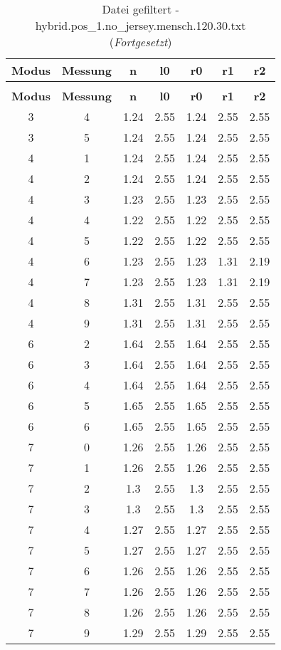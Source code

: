 \begin{longtable}{|c|c||c||c||c|c|c|}
	\caption{Datei gefiltert - hybrid.pos\_1.no\_jersey.mensch.120.30.txt} \label{tab:hybrid.pos-1.no-jersey.mensch.120.30.txt} \\ \hline
	\textbf{Modus} & \textbf{Messung} & \textbf{n} & \textbf{l0} & \textbf{r0} & \textbf{r1} & \textbf{r2}\\ \hline
	\endfirsthead
	\caption[]{Datei gefiltert - hybrid.pos\_1.no\_jersey.mensch.120.30.txt (\emph{Fortgesetzt})} \\ \hline
	\textbf{Modus} & \textbf{Messung} & \textbf{n} & \textbf{l0} & \textbf{r0} & \textbf{r1} & \textbf{r2}\\ \hline
	\endhead
	3 & 4 & 1.24 & 2.55 & 1.24 & 2.55 & 2.55 \\ \hline
	3 & 5 & 1.24 & 2.55 & 1.24 & 2.55 & 2.55 \\ \hline
	4 & 1 & 1.24 & 2.55 & 1.24 & 2.55 & 2.55 \\ \hline
	4 & 2 & 1.24 & 2.55 & 1.24 & 2.55 & 2.55 \\ \hline
	4 & 3 & 1.23 & 2.55 & 1.23 & 2.55 & 2.55 \\ \hline
	4 & 4 & 1.22 & 2.55 & 1.22 & 2.55 & 2.55 \\ \hline
	4 & 5 & 1.22 & 2.55 & 1.22 & 2.55 & 2.55 \\ \hline
	4 & 6 & 1.23 & 2.55 & 1.23 & 1.31 & 2.19 \\ \hline
	4 & 7 & 1.23 & 2.55 & 1.23 & 1.31 & 2.19 \\ \hline
	4 & 8 & 1.31 & 2.55 & 1.31 & 2.55 & 2.55 \\ \hline
	4 & 9 & 1.31 & 2.55 & 1.31 & 2.55 & 2.55 \\ \hline
	6 & 2 & 1.64 & 2.55 & 1.64 & 2.55 & 2.55 \\ \hline
	6 & 3 & 1.64 & 2.55 & 1.64 & 2.55 & 2.55 \\ \hline
	6 & 4 & 1.64 & 2.55 & 1.64 & 2.55 & 2.55 \\ \hline
	6 & 5 & 1.65 & 2.55 & 1.65 & 2.55 & 2.55 \\ \hline
	6 & 6 & 1.65 & 2.55 & 1.65 & 2.55 & 2.55 \\ \hline
	7 & 0 & 1.26 & 2.55 & 1.26 & 2.55 & 2.55 \\ \hline
	7 & 1 & 1.26 & 2.55 & 1.26 & 2.55 & 2.55 \\ \hline
	7 & 2 & 1.3 & 2.55 & 1.3 & 2.55 & 2.55 \\ \hline
	7 & 3 & 1.3 & 2.55 & 1.3 & 2.55 & 2.55 \\ \hline
	7 & 4 & 1.27 & 2.55 & 1.27 & 2.55 & 2.55 \\ \hline
	7 & 5 & 1.27 & 2.55 & 1.27 & 2.55 & 2.55 \\ \hline
	7 & 6 & 1.26 & 2.55 & 1.26 & 2.55 & 2.55 \\ \hline
	7 & 7 & 1.26 & 2.55 & 1.26 & 2.55 & 2.55 \\ \hline
	7 & 8 & 1.26 & 2.55 & 1.26 & 2.55 & 2.55 \\ \hline
	7 & 9 & 1.29 & 2.55 & 1.29 & 2.55 & 2.55 \\ \hline
\end{longtable}

